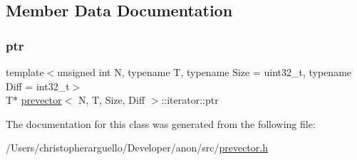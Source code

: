 \subsection{Member Data Documentation}
\mbox{\label{classprevector_1_1iterator_ab86fbe848463c1f8dc3e4296262f21ab}} 
\subsubsection{\texorpdfstring{ptr}{ptr}}
{\footnotesize\ttfamily template$<$unsigned int N, typename T, typename Size = uint32\+\_\+t, typename Diff = int32\+\_\+t$>$ \\
T$\ast$ \mbox{\hyperlink{classprevector}{prevector}}$<$ N, T, Size, Diff $>$\+::iterator\+::ptr\hspace{0.3cm}{\ttfamily [private]}}



The documentation for this class was generated from the following file\+:\begin{DoxyCompactItemize}
\item 
/\+Users/christopherarguello/\+Developer/anon/src/\mbox{\hyperlink{prevector_8h}{prevector.\+h}}\end{DoxyCompactItemize}
